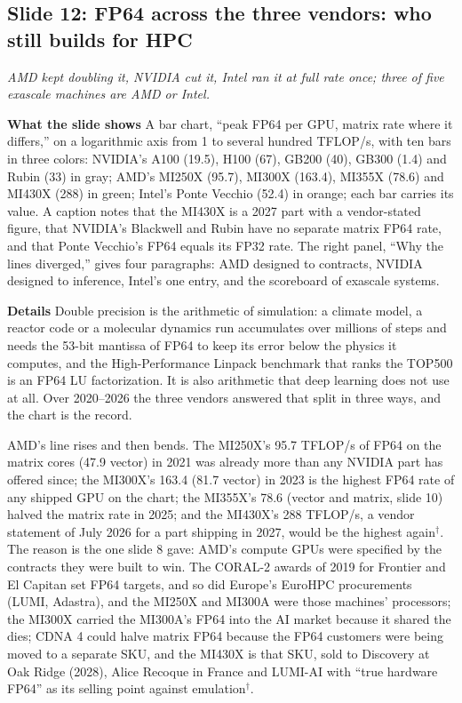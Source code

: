 \documentclass[11pt,letterpaper]{article}
\newcommand{\slide}[3]{%
  \subsection[Slide #1: #2]{Slide #1: #2}%
  {\color{muted}\itshape #3\par}\medskip}
\newcommand{\para}[1]{\medskip\noindent\textbf{#1}\quad}
\begin{document}
\slide{12}{FP64 across the three vendors: who still builds for HPC}{AMD kept doubling it, NVIDIA cut it, Intel ran it at full rate once; three of five exascale machines are AMD or Intel.}

\para{What the slide shows} A bar chart, ``peak FP64 per GPU, matrix rate where it differs,'' on a logarithmic axis from 1 to several hundred TFLOP/s, with ten bars in three colors: NVIDIA's A100 (19.5), H100 (67), GB200 (40), GB300 (1.4) and Rubin (33) in gray; AMD's MI250X (95.7), MI300X (163.4), MI355X (78.6) and MI430X (288) in green; Intel's Ponte Vecchio (52.4) in orange; each bar carries its value. A caption notes that the MI430X is a 2027 part with a vendor-stated figure, that NVIDIA's Blackwell and Rubin have no separate matrix FP64 rate, and that Ponte Vecchio's FP64 equals its FP32 rate. The right panel, ``Why the lines diverged,'' gives four paragraphs: AMD designed to contracts, NVIDIA designed to inference, Intel's one entry, and the scoreboard of exascale systems.

\para{Details} Double precision is the arithmetic of simulation: a climate model, a reactor code or a molecular dynamics run accumulates over millions of steps and needs the 53-bit mantissa of FP64 to keep its error below the physics it computes, and the High-Performance Linpack benchmark that ranks the TOP500 is an FP64 LU factorization. It is also arithmetic that deep learning does not use at all. Over 2020--2026 the three vendors answered that split in three ways, and the chart is the record.

AMD's line rises and then bends. The MI250X's 95.7 TFLOP/s of FP64 on the matrix cores (47.9 vector) in 2021 was already more than any NVIDIA part has offered since; the MI300X's 163.4 (81.7 vector) in 2023 is the highest FP64 rate of any shipped GPU on the chart; the MI355X's 78.6 (vector and matrix, slide 10) halved the matrix rate in 2025; and the MI430X's 288 TFLOP/s, a vendor statement of July 2026 for a part shipping in 2027, would be the highest again$^\dagger$. The reason is the one slide 8 gave: AMD's compute GPUs were specified by the contracts they were built to win. The CORAL-2 awards of 2019 for Frontier and El Capitan set FP64 targets, and so did Europe's EuroHPC procurements (LUMI, Adastra), and the MI250X and MI300A were those machines' processors; the MI300X carried the MI300A's FP64 into the AI market because it shared the dies; CDNA 4 could halve matrix FP64 because the FP64 customers were being moved to a separate SKU, and the MI430X is that SKU, sold to Discovery at Oak Ridge (2028), Alice Recoque in France and LUMI-AI with ``true hardware FP64'' as its selling point against emulation$^\dagger$.
\end{document}
